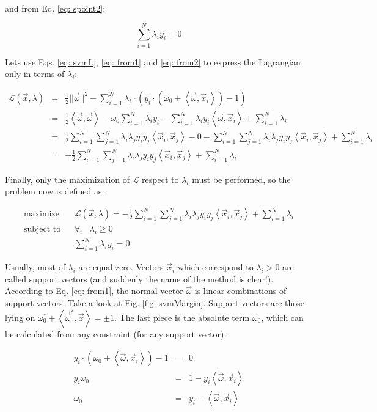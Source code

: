 and from Eq. \ref{eq: spoint2}:

\begin{equation}
 \sum_{i=1}^{N} \lambda_iy_i = 0
 \label{eq: from2}
\end{equation}

Lets use Eqs. \ref{eq: svmL}, \ref{eq: from1} and \ref{eq: from2} to express the Lagrangian only in terms of $\lambda_i$:

\begin{eqnarray}
  \mathcal{L} (\vec x, \lambda) & = & \frac{1}{2}||\vec\omega||^2 - \sum_{i=1}^N \lambda_i \cdot \left(y_i \cdot \left(\omega_0 + \left<\vec\omega, \vec x_i\right>\right) - 1\right) \\ \nonumber
  & = & \frac{1}{2}\left<\vec\omega, \vec\omega\right> - \omega_0 \sum_{i=1}^N \lambda_iy_i - \sum_{i=1}^N\lambda_iy_i\left<\vec\omega, \vec x_i\right> + \sum_{i=1}^{N}\lambda_i \\ \nonumber
  & = & \frac{1}{2}\sum_{i=1}^N\sum_{j=1}^N\lambda_i\lambda_jy_iy_j\left<\vec x_i, \vec x_j\right> - 0 - \sum_{i=1}^N\sum_{j=1}^N\lambda_i\lambda_jy_iy_j\left<\vec x_i, \vec x_j\right> + \sum_{i=1}^{N}\lambda_i \\ \nonumber
  & = & -\frac{1}{2}\sum_{i=1}^N\sum_{j=1}^N\lambda_i\lambda_jy_iy_j\left<\vec x_i, \vec x_j\right> + \sum_{i=1}^{N}\lambda_i
\end{eqnarray}

Finally, only the maximization of $\mathcal{L}$ respect to $\lambda_i$ must be performed, so the problem now is defined as:

\begin{eqnarray}\label{eq: optimizationLM}
 \text{maximize} & & \mathcal{L} (\vec x, \lambda) = -\frac{1}{2}\sum_{i=1}^N\sum_{j=1}^N\lambda_i\lambda_jy_iy_j\left<\vec x_i, \vec x_j\right> + \sum_{i=1}^{N}\lambda_i \\ \nonumber
 \text{subject to} & & \forall_i \hspace{10pt} \lambda_i \geq 0 \\ \nonumber
 \text{} & & \sum_{i=1}^{N} \lambda_iy_i = 0
\end{eqnarray}

Usually, most of $\lambda_i$ are equal zero. Vectors $\vec x_i$ which correspond to $\lambda_i > 0$ are called support vectors (and suddenly the name of the method is clear!). According to Eq. \ref{eq: from1}, the normal vector $\vec\omega$ is linear combinations of support vectors. Take a look at Fig. \ref{fig: svmMargin}. Support vectors are those lying on $\omega_0^* + \left<\vec\omega^*, \vec x\right> = \pm 1$. The last piece is the absolute term $\omega_0$, which can be calculated from any constraint (for any support vector):

\begin{eqnarray}
 y_i \cdot \left(\omega_0 + \left<\vec\omega, \vec x_i\right>\right) - 1 & = & 0 \\ \nonumber
 y_i\omega_0 & = & 1 - y_i \left<\vec\omega, \vec x_i\right> \\ \nonumber
 \omega_0 & = & y_i - \left<\vec\omega, \vec x_i\right>
\end{eqnarray}

